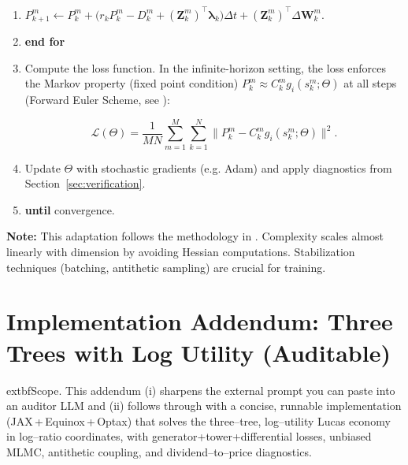 ﻿\documentclass[11pt,letterpaper,oneside]{article}
\numberwithin{equation}{section}
\newcommand{\1}{\mathbf{1}}
\begin{document}
\begin{tcolorbox}[float, title={Algorithm 1: Deep BSDE Training Loop (Infinite-Horizon Adaptation)}, label={alg:deepbsde}]
\begin{enumerate}[leftmargin=1.5em,itemsep=0.5em]
      \item \quad\quad\quad $P_{k+1}^m \leftarrow P_k^m + \big(r_k P_k^m - D_k^m + (\bm{Z}_k^m)^{\top}\bm{\lambda}_k\big)\Delta t + (\bm{Z}_k^m)^{\top}\Delta\bm{W}_k^m$.

  \item \quad \textbf{end for}

    \item \quad Compute the loss function. In the infinite-horizon setting, the loss enforces the Markov property (fixed point condition) $P_k^m \approx C_k^m g_i(s_k^m;\Theta)$ at all steps (Forward Euler Scheme, see \cite{huang2025probabilistic}):

  \begin{equation*}
    \mathcal{L}(\Theta) = \frac{1}{MN}\sum_{m=1}^M\sum_{k=1}^N \big\lVert P_k^m - C_k^m g_i(s_k^m;\Theta) \big\rVert^2.
  \end{equation*}

    \item \quad Update $\Theta$ with stochastic gradients (e.g. Adam) and apply diagnostics from Section~\ref{sec:verification}.

  \item \textbf{until} convergence.

\end{enumerate}

\textbf{Note:} This adaptation follows the methodology in \cite{han2018solving,huang2025probabilistic}. Complexity scales almost linearly with dimension by avoiding Hessian computations. Stabilization techniques (batching, antithetic sampling) are crucial for training.

\end{tcolorbox}


\clearpage
\section{Implementation Addendum: Three Trees with Log Utility (Auditable)}\label{sec:addendum_three_trees}

\begin{tcolorbox}[didacticstyle]
	extbf{Scope.} This addendum (i) sharpens the external prompt you can paste into an auditor LLM and (ii) follows through with a concise, runnable implementation (JAX\,+\,Equinox\,+\,Optax) that solves the three--tree, log--utility Lucas economy in log--ratio coordinates, with generator+tower+differential losses, unbiased MLMC, antithetic coupling, and dividend--to--price diagnostics.
\end{tcolorbox}
\end{document}
